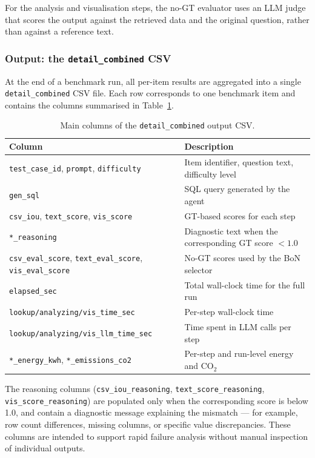\documentclass[11pt,a4paper]{article}
\begin{document}
For the analysis and visualisation steps, the no-GT evaluator uses an LLM judge
that scores the output against the retrieved data and the original question, rather
than against a reference text.

\subsubsection{Output: the \texttt{detail\_combined} CSV}

At the end of a benchmark run, all per-item results are aggregated into a single
\texttt{detail\_combined} CSV file. Each row corresponds to one benchmark item and
contains the columns summarised in Table~\ref{tab:output_cols}.

\begin{table}[h]
\centering
\begin{tabular}{|l|p{8cm}|}
\hline
\rowcolor{bluePoli!30}
\textbf{Column} & \textbf{Description} \T\B \\
\hline
\texttt{test\_case\_id}, \texttt{prompt}, \texttt{difficulty} & Item identifier, question text, difficulty level \T\B \\
\texttt{gen\_sql} & SQL query generated by the agent \T\B \\
\texttt{csv\_iou}, \texttt{text\_score}, \texttt{vis\_score} & GT-based scores for each step \T\B \\
\texttt{*\_reasoning} & Diagnostic text when the corresponding GT score $< 1.0$ \T\B \\
\texttt{csv\_eval\_score}, \texttt{text\_eval\_score}, \texttt{vis\_eval\_score} & No-GT scores used by the BoN selector \T\B \\
\texttt{elapsed\_sec} & Total wall-clock time for the full run \T\B \\
\texttt{lookup/analyzing/vis\_time\_sec} & Per-step wall-clock time \T\B \\
\texttt{lookup/analyzing/vis\_llm\_time\_sec} & Time spent in LLM calls per step \T\B \\
\texttt{*\_energy\_kwh}, \texttt{*\_emissions\_co2} & Per-step and run-level energy and CO$_2$ \T\B \\
\hline
\end{tabular}
\caption{Main columns of the \texttt{detail\_combined} output CSV.}
\label{tab:output_cols}
\end{table}

The reasoning columns (\texttt{csv\_iou\_reasoning}, \texttt{text\_score\_reasoning},
\texttt{vis\_score\_reasoning}) are populated only when the corresponding score is
below 1.0, and contain a diagnostic message explaining the mismatch — for example,
row count differences, missing columns, or specific value discrepancies. These
columns are intended to support rapid failure analysis without manual inspection of
individual outputs.
\end{document}
